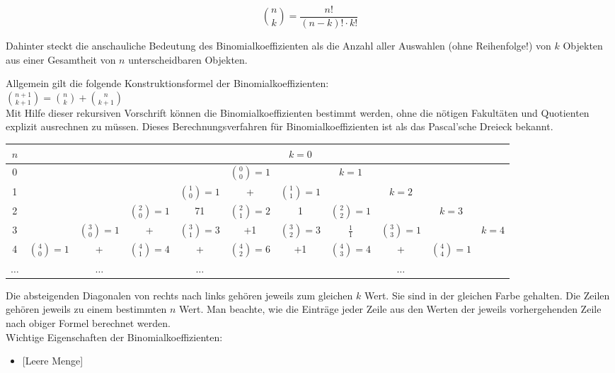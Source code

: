\documentclass[10pt]{article}
\begin{document}
$$
\binom{n}{k}=\frac{n!}{(n-k)!\cdot k!}
$$

Dahinter steckt die anschauliche Bedeutung des Binomialkoeffizienten als die Anzahl aller Auswahlen (ohne Reihenfolge!) von $k$ Objekten aus einer Gesamtheit von $n$ unterscheidbaren Objekten.

Allgemein gilt die folgende Konstruktionsformel der Binomialkoeffizienten:\\
$\binom{n+1}{k+1}=\binom{n}{k}+\binom{n}{k+1}$\\
Mit Hilfe dieser rekursiven Vorschrift können die Binomialkoeffizienten bestimmt werden, ohne die nötigen Fakultäten und Quotienten explizit ausrechnen zu müssen. Dieses Berechnungsverfahren für Binomialkoeffizienten ist als das Pascal'sche Dreieck bekannt.

\begin{center}
\begin{tabular}{|c|c|c|c|c|c|c|c|c|c|c|}
\hline
$n$ &  &  &  &  &  & $k=0$ &  &  &  &  \\
\hline
0 &  &  &  &  & $\binom{0}{0}=1$ &  & $k=1$ &  &  &  \\
\hline
1 &  &  &  & $\binom{1}{0}=1$ & + & $\binom{1}{1}=1$ &  & $k=2$ &  &  \\
\hline
2 &  &  & $\binom{2}{0}=1$ & 71 & $\binom{2}{1}=2$ & 1 & $\binom{2}{2}=1$ &  & $k=3$ &  \\
\hline
3 &  & $\binom{3}{0}=1$ & + & $\binom{3}{1}=3$ & +1 & $\binom{3}{2}=3$ & $\frac{1}{1}$ & $\binom{3}{3}=1$ &  & $k=4$ \\
\hline
4 & $\binom{4}{0}=1$ & + & $\binom{4}{1}=4$ & + & $\binom{4}{2}=6$ & +1 & $\binom{4}{3}=4$ & + & $\binom{4}{4}=1$ &  \\
\hline
$\ldots$ &  & $\ldots$ &  & $\ldots$ &  &  &  & $\ldots$ &  &  \\
\hline
\end{tabular}
\end{center}

Die absteigenden Diagonalen von rechts nach links gehören jeweils zum gleichen $k$ Wert. Sie sind in der gleichen Farbe gehalten. Die Zeilen gehören jeweils zu einem bestimmten $n$ Wert. Man beachte, wie die Einträge jeder Zeile aus den Werten der jeweils vorhergehenden Zeile nach obiger Formel berechnet werden.\\
Wichtige Eigenschaften der Binomialkoeffizienten:

\begin{itemize}
  \item \hspace{0pt} [Leere Menge]
\end{itemize}
\end{document}
